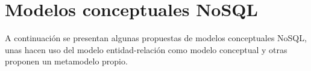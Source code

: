 \section{Modelos conceptuales NoSQL}
A continuación se presentan algunas propuestas de modelos conceptuales NoSQL, unas hacen uso del modelo entidad-relación como modelo conceptual y otras proponen un metamodelo propio.
